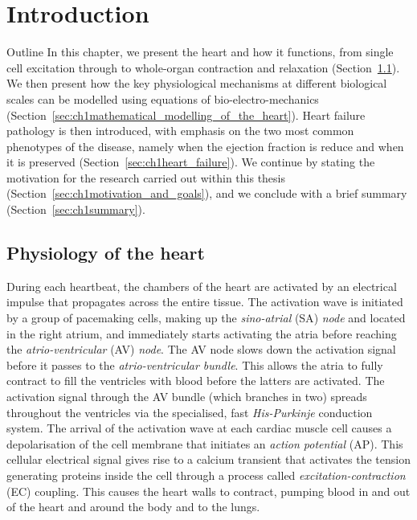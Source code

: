 \chapter{Introduction}\label{cha:chapter1}
%
%
%
\begin{remark}{Outline}
    In this chapter, we present the heart and how it functions, from single cell excitation through to whole-organ contraction and relaxation (Section~\ref{sec:ch1physiology_of_the_heart}). We then present how the key physiological mechanisms at different biological scales can be modelled using equations of bio-electro-mechanics (Section~\ref{sec:ch1mathematical_modelling_of_the_heart}). Heart failure pathology is then introduced, with emphasis on the two most common phenotypes of the disease, namely when the ejection fraction is reduce and when it is preserved (Section~\ref{sec:ch1heart_failure}). We continue by stating the motivation for the research carried out within this thesis (Section~\ref{sec:ch1motivation_and_goals}), and we conclude with a brief summary (Section~\ref{sec:ch1summary}).
\end{remark}


%
%
%
\section{Physiology of the heart}\label{sec:ch1physiology_of_the_heart}
During each heartbeat, the chambers of the heart are activated by an electrical impulse that propagates across the entire tissue. The activation wave is initiated by a group of pacemaking cells, making up the \textit{sino-atrial} (\acs{SA}) \textit{node} and located in the right atrium, and immediately starts activating the atria before reaching the \textit{atrio-ventricular} (\acs{AV}) \textit{node}. The AV node slows down the activation signal before it passes to the \textit{atrio-ventricular bundle}. This allows the atria to fully contract to fill the ventricles with blood before the latters are activated. The activation signal through the AV bundle (which branches in two) spreads throughout the ventricles via the specialised, fast \textit{His-Purkinje} conduction system. The arrival of the activation wave at each cardiac muscle cell causes a depolarisation of the cell membrane that initiates an \textit{action potential} (\acs{AP}). This cellular electrical signal gives rise to a calcium transient that activates the tension generating proteins inside the cell through a process called \textit{excitation-contraction} (\acs{EC}) coupling. This causes the heart walls to contract, pumping blood in and out of the heart and around the body and to the lungs.

